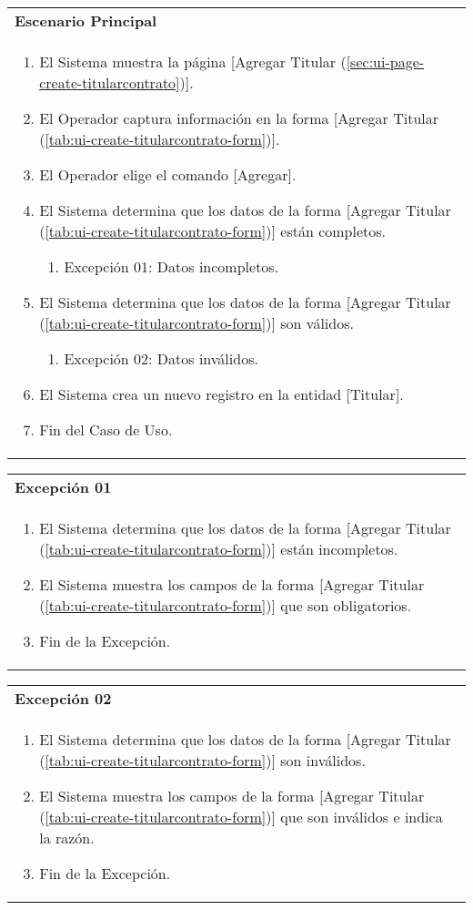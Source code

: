 	\begin{tabular}{ p{15.5cm} }
		\textbf{Escenario Principal} \\
		\begin{enumerate}
			\item El Sistema muestra la p\'agina [Agregar Titular (\ref{sec:ui-page-create-titularcontrato})].
			\item El Operador captura informaci\'on en la forma [Agregar Titular (\ref{tab:ui-create-titularcontrato-form})].
			\item El Operador elige el comando [Agregar].
			\item El Sistema determina que los datos de la forma [Agregar Titular (\ref{tab:ui-create-titularcontrato-form})] est\'an completos.
				\begin{enumerate}
					\item Excepci\'on 01: Datos incompletos.
				\end{enumerate}
			\item El Sistema determina que los datos de la forma [Agregar Titular (\ref{tab:ui-create-titularcontrato-form})] son v\'alidos.
				\begin{enumerate}
					\item Excepci\'on 02: Datos inv\'alidos.
				\end{enumerate}
			\item El Sistema crea un nuevo registro en la entidad [Titular].
			\item Fin del Caso de Uso.
		\end{enumerate}
	\end{tabular}
	
	\begin{tabular}{ p{15.5cm} }
		\textbf{Excepci\'on 01} \\
		\begin{enumerate}
			\item El Sistema determina que los datos de la forma [Agregar Titular (\ref{tab:ui-create-titularcontrato-form})] est\'an incompletos.
			\item El Sistema muestra los campos de la forma [Agregar Titular (\ref{tab:ui-create-titularcontrato-form})] que son obligatorios.
			\item Fin de la Excepci\'on.
		\end{enumerate}
	\end{tabular}
	
	\begin{tabular}{ p{15.5cm} }
		\textbf{Excepci\'on 02} \\
		\begin{enumerate}
			\item El Sistema determina que los datos de la forma [Agregar Titular (\ref{tab:ui-create-titularcontrato-form})] son inv\'alidos.
			\item El Sistema muestra los campos de la forma [Agregar Titular (\ref{tab:ui-create-titularcontrato-form})] que son inv\'alidos e indica la raz\'on.
			\item Fin de la Excepci\'on.
		\end{enumerate}
	\end{tabular}
	
